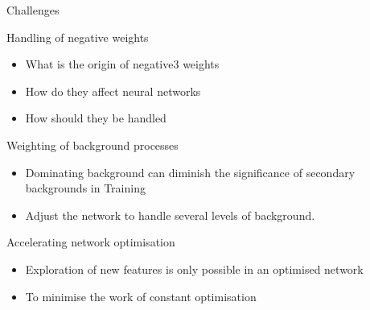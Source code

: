 \begin{frame}{Challenges}
    \begin{block}{Handling of negative weights}
        \begin{itemize}
            \item What is the origin of negative3 weights
            \item How do they affect neural networks
            \item How should they be handled
        \end{itemize}
    \end{block}
    \begin{block}{Weighting of background processes}
        \begin{itemize}
            \item Dominating background can diminish the significance of secondary backgrounds in Training
            \item Adjust the network to handle several levels of background.
        \end{itemize}
    \end{block}
    \begin{block}{Accelerating network optimisation}
        \begin{itemize}
            \item Exploration of new features is only possible in an optimised network
            \item To minimise the work of constant optimisation
        \end{itemize}
    \end{block}
\end{frame}